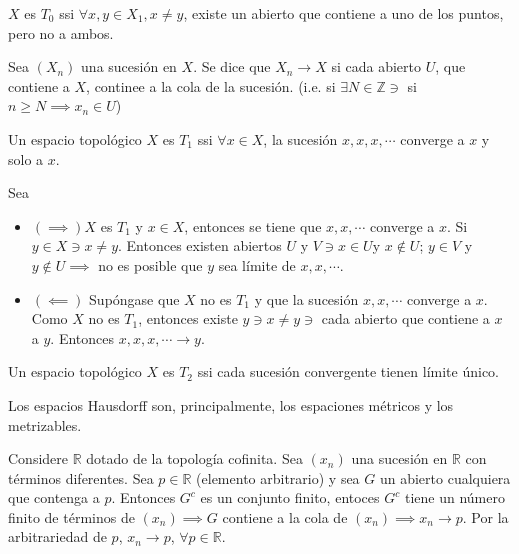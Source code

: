 \begin{definicion}
    $X$ es $T_0$ ssi $\forall x,y\in X_1, x\neq y$, existe un abierto que contiene a uno de los puntos, pero no a ambos.  
\end{definicion}
\begin{cajita}
    Sea $(X_n)$ una sucesión en $X$. Se dice que $X_n\to X$ si cada abierto $U$, que contiene a $X$, continee a la cola de la sucesión. (i.e. si $\exists N\in \mathbb{Z}\ni$ si $n\geq N\implies x_n\in U$)
\end{cajita}
\begin{teorema}
    Un espacio topológico $X$ es $T_1$ ssi $\forall x\in X$, la sucesión $x,x,x,\cdots $ converge a $x$ y solo a $x$. 
    \begin{dem}
        Sea 
        \begin{itemize}
            \item $(\implies) X$ es $T_1$ y $x\in X$, entonces se tiene que $x,x,\cdots$ converge a $x$. Si $y\in X\ni x\neq y$. Entonces existen abiertos $U$ y $V\ni x\in U $y $x\not\in U$; $y\in V$ y $y\not\in U\implies$ no es posible que $y$ sea límite de $x,x,\cdots$. 
            \item $(\impliedby)$ Supóngase que $X$ no es $T_1$ y  que la sucesión $x,x,\cdots$ converge a $x$. Como $X$ no es $T_1$, entonces existe $y\ni x\neq y\ni$ cada abierto que contiene a $x$ a $y$. Entonces $x,x,x,\cdots \to y$.  
        \end{itemize}
    \end{dem}
\end{teorema}

\begin{teorema}
    Un espacio topológico $X$ es $T_2$ ssi cada sucesión convergente tienen límite único. 
\end{teorema}

\begin{nota}
    Los espacios Hausdorff son, principalmente, los espaciones métricos y los metrizables. 
\end{nota}

\begin{ejemplo}
    Considere $\mathbb{R}$ dotado de la topología cofinita. Sea $(x_n)$ una sucesión en $\mathbb{R}$ con términos diferentes. Sea $p\in \mathbb{R}$  (elemento arbitrario) y sea $G$ un abierto cualquiera que contenga a $p$. Entonces $G^c$ es un conjunto finito, entoces $G^c$ tiene un número finito de términos de $(x_n)\implies G$  contiene a la cola de $(x_n)\implies x_n\to p$. Por la arbitrariedad de $p$, $x_n\to p$, $\forall p\in \mathbb{R}$.  
\end{ejemplo}


